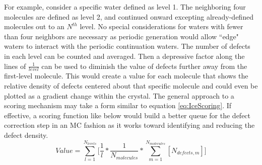 For example, consider a specific water defined as level 1. 
The neighboring four molecules are defined as level 2, and continued onward excepting already-defined molecules out to an $N^{th}$ level. 
No special considerations for waters with fewer than four neighbors are necessary as periodic generation would allow ``edge" waters to interact with the periodic continuation waters.
The number of defects in each level can be counted and averaged.
Then a depressive factor along the lines of $\frac{1}{level}$ can be used to diminish the value of defects further away from the first-level molecule.
This would create a value for each molecule that shows the relative density of defects centered about that specific molecule and could even be plotted as a gradient change within the crystal.
The general approach to a scoring mechanism may take a form similar to equation \ref{eq:IceScoring}.
If effective, a scoring function like below would build a better queue for the defect correction step in an MC fashion as it works toward identifying and reducing the defect density.
\begin{equation}
\label{eq:IceScoring}
Value = \sum_{l=1}^{N_{levels}} \Big[\frac{1}{l} * \frac{1} {N_{molecules}} *\sum_{m=1}^{N_{molecules}}[N_{defects, m}]\Big]
\end{equation}





